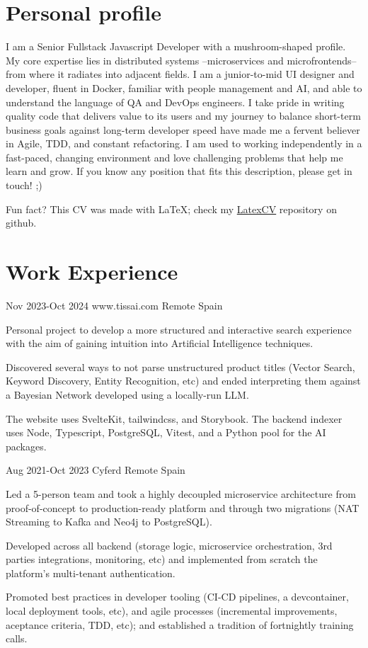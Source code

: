 \documentclass[10pt]{CurriculumVitae}
\begin{document}
  \makeheading

  \section{Personal profile}
    {
      I am a Senior Fullstack Javascript Developer with a mushroom-shaped profile.
      My core expertise lies in distributed systems –microservices and microfrontends– from where it radiates into adjacent fields. I am a junior-to-mid UI designer and developer, fluent in Docker, familiar with people management and AI, and able to understand the language of QA and DevOps engineers.
      I take pride in writing quality code that delivers value to its users and my journey to balance short-term business goals against long-term developer speed have made me a fervent believer in Agile, TDD, and constant refactoring.
      I am used to working independently in a fast-paced, changing environment and love challenging problems that help me learn and grow.
      If you know any position that fits this description, please get in touch! ;) 
      
      \null\hfill {\scriptsize Fun fact? This CV was made with LaTeX; check my \href{https://github.com/antsago/LatexCV}{LatexCV} repository on github.}
    }


  \section{Work Experience}

      {Nov 2023-Oct 2024}
      {www.tissai.com}
      {Remote}
      {Spain}
      {
        \item Personal project to develop a more structured and interactive search experience with the aim of gaining intuition into Artificial Intelligence techniques.
        \item Discovered several ways to not parse unstructured product titles (Vector Search, Keyword Discovery, Entity Recognition, etc) and ended interpreting them against a Bayesian Network developed using a locally-run LLM.
        \item The website uses SvelteKit, tailwindcss, and Storybook. The backend indexer uses Node, Typescript, PostgreSQL, Vitest, and a Python pool for the AI packages.
      }

      {Aug 2021-Oct 2023}
      {Cyferd}
      {Remote}
      {Spain}
      {
        \item Led a 5-person team and took a highly decoupled microservice architecture from proof-of-concept to production-ready platform and through two migrations (NAT Streaming to Kafka and Neo4j to PostgreSQL).
        \item Developed across all backend (storage logic, microservice orchestration, 3rd parties integrations, monitoring, etc) and implemented from scratch the platform's multi-tenant authentication.
        \item Promoted best practices in developer tooling (CI-CD pipelines, a devcontainer, local deployment tools, etc), and agile processes (incremental improvements, aceptance criteria, TDD, etc); and established a tradition of fortnightly training calls.
      }
\end{document}
